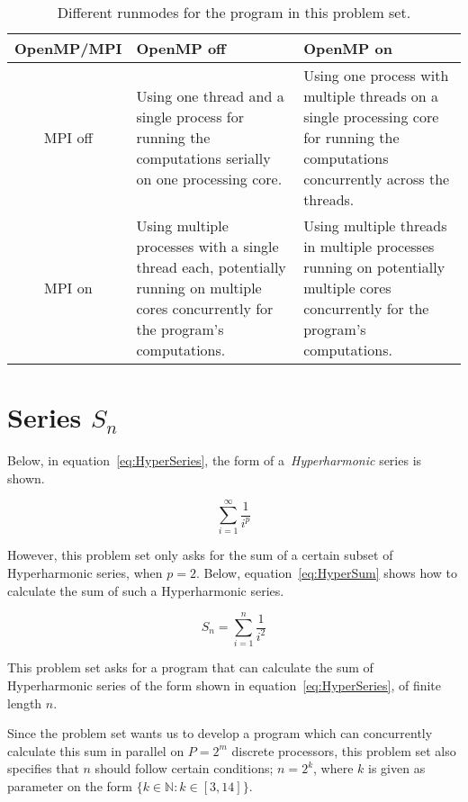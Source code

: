 \documentclass[fontsize=11pt,paper=a4,titlepage]{report}
\begin{document}
\begin{table}[h]
	\begin{tabularx}{\linewidth}{c|X|X|}
			OpenMP/MPI	& OpenMP off & OpenMP on	\\ \hline
			MPI off		& Using one thread and a single process for running the
computations serially on one processing core. & Using one process with multiple
threads on a single processing core for running the computations concurrently
across the threads. \\ \hline
			MPI on		& Using multiple processes with a single thread each,
potentially running on multiple cores concurrently for the program's
computations. & Using multiple threads in multiple processes running on
potentially multiple cores concurrently for the program's computations. \\
\hline
	\end{tabularx}
	\caption{Different runmodes for the program in this problem set.}
	\label{tab:RunModes}
\end{table}

\section{Series $S_n$}

Below, in equation~\ref{eq:HyperSeries}, the form of a~\textit{Hyperharmonic}
series is shown.

\begin{equation}
	\sum_{i=1}^{\infty} \frac{1}{i^p}
	\label{eq:HyperSeries}
\end{equation}

However, this problem set only asks for the sum of a certain subset of
Hyperharmonic series, when $p = 2$. Below, equation~\ref{eq:HyperSum} shows how
to calculate the sum of such a Hyperharmonic series.

\begin{equation}
	S_n = \sum_{i=1}^{n} \frac{1}{i^2}
	\label{eq:HyperSum}
\end{equation}

This problem set asks for a program that can calculate the sum of Hyperharmonic
series of the form shown in equation~\ref{eq:HyperSeries}, of finite length $n$.

Since the problem set wants us to develop a program which can concurrently
calculate this sum in parallel on $P = 2^m$ discrete processors, this problem
set also specifies that $n$ should follow certain conditions; $n = 2^k$, where
$k$ is given as parameter on the form $\{k \in \mathbb{N} : k \in [3, 14]\}$.
\end{document}
